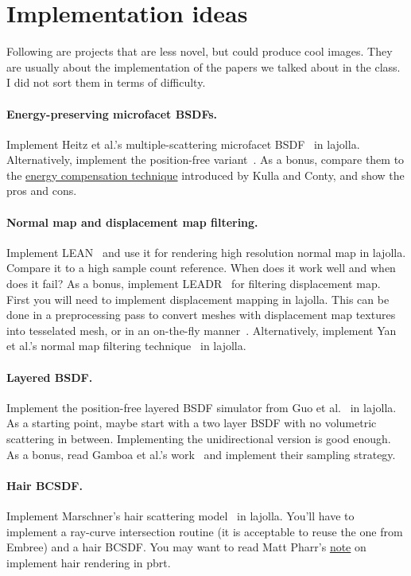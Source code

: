 \section{Implementation ideas}

Following are projects that are less novel, but could produce cool images. 
They are usually about the implementation of the papers we talked about in the class.
I did not sort them in terms of difficulty.

\paragraph{Energy-preserving microfacet BSDFs.} 
Implement Heitz et al.'s multiple-scattering microfacet BSDF~\cite{Heitz:2016:MMB} in lajolla.
Alternatively, implement the position-free variant~\cite{Wang:2022:PMC}.
As a bonus, compare them to the \href{https://blog.selfshadow.com/publications/s2017-shading-course/imageworks/s2017_pbs_imageworks_slides_v2.pdf}{energy compensation technique} introduced by Kulla and Conty, and show the pros and cons.

\paragraph{Normal map and displacement map filtering.}
Implement LEAN~\cite{Olano:2010:LM} and use it for rendering high resolution normal map in lajolla.
Compare it to a high sample count reference.
When does it work well and when does it fail?
As a bonus, implement LEADR~\cite{Dupuy:2013:LEA} for filtering displacement map.
First you will need to implement displacement mapping in lajolla.
This can be done in a preprocessing pass to convert meshes with displacement map textures into tesselated mesh, or in an on-the-fly manner~\cite{Thonat:2021:TDM}.
Alternatively, implement Yan et al.'s normal map filtering technique~\cite{Yan:2014:RGH} in lajolla. 

\paragraph{Layered BSDF.}
Implement the position-free layered BSDF simulator from Guo et al.~\cite{Guo:2018:PMC} in lajolla.
As a starting point, maybe start with a two layer BSDF with no volumetric scattering in between.
Implementing the unidirectional version is good enough.
As a bonus, read Gamboa et al.'s work~\cite{Gamboa:2020:ETE} and implement their sampling strategy.

\paragraph{Hair BCSDF.}
Implement Marschner's hair scattering model~\cite{Marschner:2003:LSH} in lajolla.
You'll have to implement a ray-curve intersection routine (it is acceptable to reuse the one from Embree) and a hair BCSDF.
You may want to read Matt Pharr's \href{https://www.pbrt.org/hair.pdf}{note} on implement hair rendering in pbrt.

